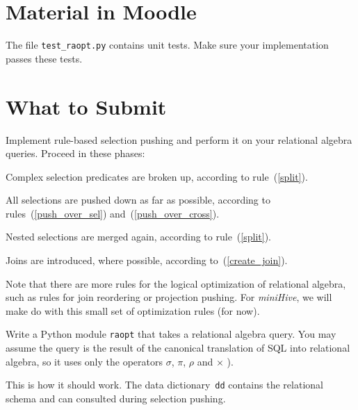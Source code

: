\documentclass[12pt]{exam}
\begin{document}
\section{Material in Moodle}

\noindent
\begin{compactitem}
\item
The file \verb!test_raopt.py! contains unit tests. Make sure your implementation passes these tests.
\end{compactitem}

\section{What to Submit}
\begin{compactitem}

\item 
Implement rule-based selection pushing and perform it on your relational algebra queries. 
Proceed in these phases:
\begin{compactenum}
    \item Complex selection predicates are broken up, according to rule~(\ref{split}).
    \item All selections are pushed down as far as possible, according to rules~(\ref{push_over_sel}) and~(\ref{push_over_cross}).
    \item Nested selections are merged again, according to rule~(\ref{split}).
    \item Joins are introduced, where possible, according to~(\ref{create_join}).

\end{compactenum}

Note that there are more rules for the logical optimization of relational algebra, such as rules for join reordering or projection pushing. For {\em miniHive}\/, we will make do with this small set of optimization rules (for now). 

\item 
\noindent
Write a Python module \verb!raopt! that takes a relational algebra query. You may assume the query is the result of the canonical translation of SQL into relational algebra, so it uses only the operators $\sigma$, $\pi$, $\rho$ and $\times$ ). 

This is how it should work. The data dictionary~\verb!dd! contains the relational schema and can consulted during selection pushing.

\end{compactitem}
\end{document}
